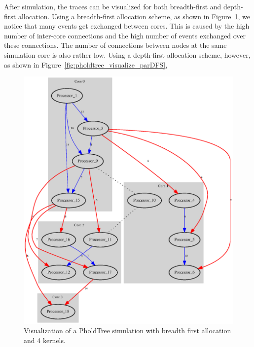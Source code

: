 After simulation, the traces can be visualized for both breadth-first and depth-first allocation.
Using a breadth-first allocation scheme, as shown in Figure~\ref{fig:pholdtree_visualize_parBFS}, we notice that many events get exchanged between cores.
This is caused by the high number of inter-core connections and the high number of events exchanged over these connections.
The number of connections between nodes at the same simulation core is also rather low.
Using a depth-first allocation scheme, however, as shown in Figure~\ref{fig:pholdtree_visualize_parDFS},

\begin{figure}
    \center
    \begin{minipage}{0.45\textwidth}
            \center
            \includegraphics[width=\textwidth]{fig/pholdtreed1n3t5000c4BFS.eps}
            \caption{Visualization of a PholdTree simulation with breadth first allocation and 4 kernels.}
            \label{fig:pholdtree_visualize_parBFS}
    \end{minipage}
    \begin{minipage}{0.45\textwidth}
            \center

\end{minipage}
\end{figure}
